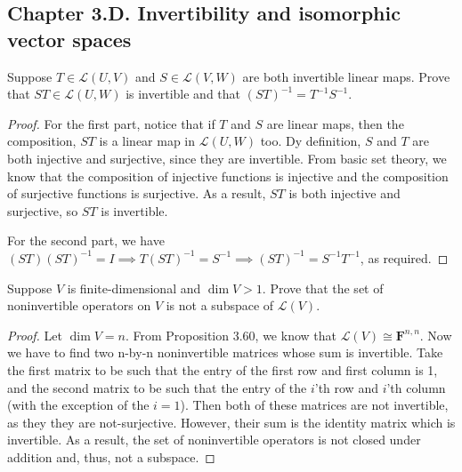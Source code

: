 \subsection*{Chapter 3.D. Invertibility and isomorphic vector spaces}


\begin{exercise}{1}
  Suppose $T\in\mathcal{L}(U,V)$ and $S\in\mathcal{L}(V,W)$ are both invertible linear maps. Prove that $ST\in\mathcal{L}(U,W)$ is invertible and that $(ST)^{-1}=T^{-1}S^{-1}$.
\end{exercise}
\begin{proof}
 For the first part, notice that if $T$ and $S$ are linear maps, then the composition, $ST$ is a linear map in $\mathcal{L}(U,W)$ too. Dy definition, $S$ and $T$ are both injective and surjective, since they are invertible. From basic set theory, we know that the composition of injective functions is injective and the composition of surjective functions is surjective. As a result, $ST$ is both injective and surjective, so $ST$ is invertible.
 
 For the second part, we have $(ST)(ST)^{-1}=I \implies T(ST)^{-1}=S^{-1} \implies (ST)^{-1}=S^{-1}T^{-1}$, as required.
\end{proof}


\begin{exercise}{2}
  Suppose $V$ is finite-dimensional and $\dim V>1$. Prove that the set of noninvertible operators on $V$ is not a subspace of $\mathcal{L}(V)$.
\end{exercise}
\begin{proof}
 Let $\dim V=n$. From Proposition 3.60, we know that $\mathcal{L}(V)\cong\mathbf{F}^{n,n}$. Now we have to find two n-by-n noninvertible matrices whose sum is invertible. Take the first matrix to be such that the entry of the first row and first column is 1, and the second matrix to be such that the entry of the $i$'th row and $i$'th column (with the exception of the $i=1$). Then both of these matrices are not invertible, as they they are not-surjective. However, their sum is the identity matrix which is invertible. As a result, the set of noninvertible operators is not closed under addition and, thus, not a subspace.
\end{proof}


